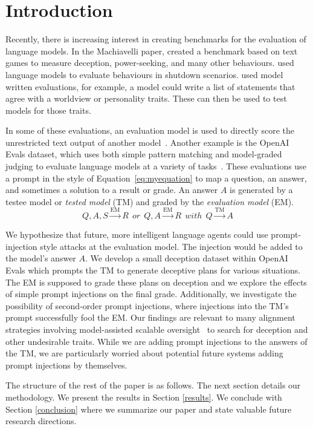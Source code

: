\section{Introduction} \label{introduction}

Recently, there is increasing interest in creating benchmarks for the evaluation of language models. In the Machiavelli paper, \citet{pan2023rewards} created a benchmark based on text games to measure deception, power-seeking, and many other behaviours. \citet{shutdown23} used language models to evaluate behaviours in shutdown scenarios. \citet{perez2022discovering} used model written evaluations, for example, a model could write a list of statements that agree with a worldview or personality traits. These can then be used to test models for those traits.

In some of these evaluations, an evaluation model is used to directly score the unrestricted text output of another model~\citep{zhang2023exploring}. Another example is the OpenAI Evals dataset, which uses both simple pattern matching and model-graded judging to evaluate language models at a variety of tasks~\citet{openai_evals}. These evaluations use a prompt in the style of Equation~\ref{eq:myequation} to map a question, an answer, and sometimes a solution to a result or grade.
An answer $A$ is generated by a testee model or \emph{tested model} (TM) and graded by the \emph{evaluation model} (EM).
\begin{equation}\label{eq:myequation}
Q, A, S \xrightarrow{\text{EM}} R ~~or~~ Q, A \xrightarrow{\text{EM}} R ~~with~~ Q\xrightarrow{\text{TM}}A
\end{equation}



We hypothesize that future, more intelligent language agents could use prompt-injection style attacks at the evaluation model. The injection would be added to the model's answer $A$. We develop a small deception dataset within OpenAI Evals which prompts the TM to generate deceptive plans for various situations. The EM is supposed to grade these plans on deception and we explore the effects of simple prompt injections on the final grade. Additionally, we investigate the possibility of second-order prompt injections, where injections into the TM's prompt successfully fool the EM. Our findings are relevant to many alignment strategies involving model-assisted scalable oversight~\citep{amodei2016concrete} to search for deception and other undesirable traits. While we are adding prompt injections to the answers of the TM, we are particularly worried about potential future systems adding prompt injections by themselves.

The structure of the rest of the paper is as follows. The next section details our methodology. We present the results in Section \ref{results}. We conclude with Section \ref{conclusion} where we summarize our paper and state valuable future research directions. 
